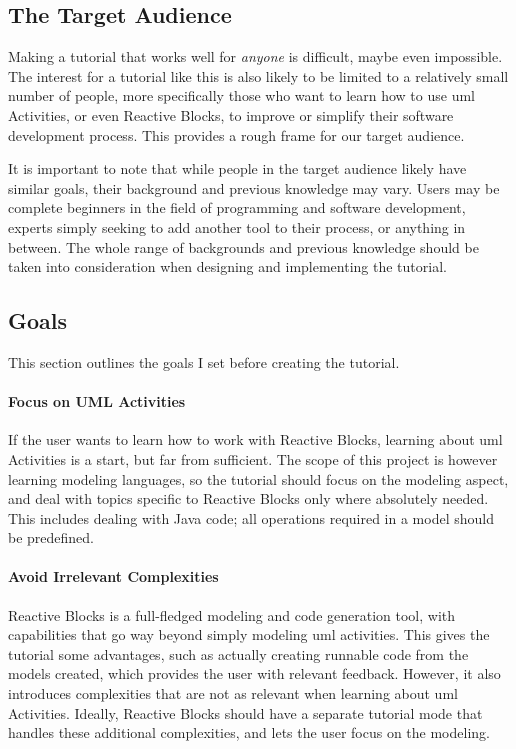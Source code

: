 \subsection{The Target Audience}
\label{sec:target_audience}
Making a tutorial that works well for \emph{anyone} is difficult, maybe even impossible. The interest for a tutorial like this is also likely to be limited to a relatively small number of people, more specifically those who want to learn how to use \gls{uml} Activities, or even Reactive Blocks, to improve or simplify their software development process. This provides a rough frame for our target audience.

\noindent
It is important to note that while people in the target audience likely have similar goals, their background and previous knowledge may vary. Users may be complete beginners in the field of programming and software development, experts simply seeking to add another tool to their process, or anything in between. The whole range of backgrounds and previous knowledge should be taken into consideration when designing and implementing the tutorial.

\subsection{Goals}
\label{sec:tutorial_goals}
This section outlines the goals I set before creating the tutorial.

\paragraph{Focus on UML Activities} If the user wants to learn how to work with Reactive Blocks, learning about \gls{uml} Activities is a start, but far from sufficient. The scope of this project is however learning modeling languages, so the tutorial should focus on the modeling aspect, and deal with topics specific to Reactive Blocks only where absolutely needed. This includes dealing with Java code; all operations required in a model should be predefined.

\paragraph{Avoid Irrelevant Complexities} Reactive Blocks is a full-fledged modeling and code generation tool, with capabilities that go way beyond simply modeling \gls{uml} activities. This gives the tutorial some advantages, such as actually creating runnable code from the models created, which provides the user with relevant feedback. However, it also introduces complexities that are not as relevant when learning about \gls{uml} Activities. Ideally, Reactive Blocks should have a separate tutorial mode that handles these additional complexities, and lets the user focus on the modeling.

